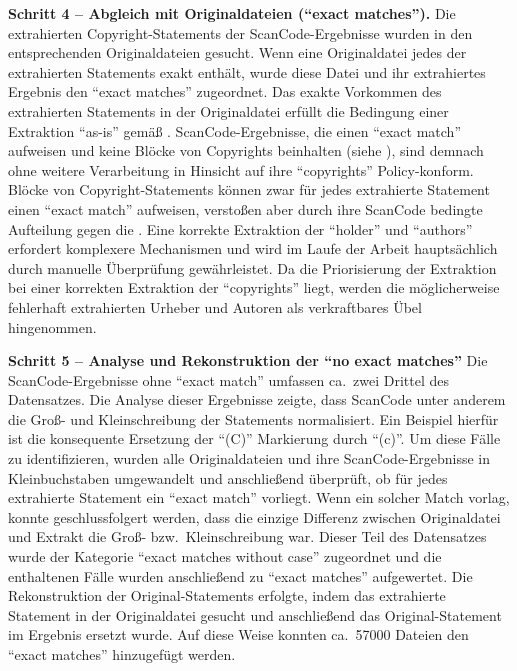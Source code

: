 \textbf{Schritt 4 -- Abgleich mit Originaldateien (\enquote{exact matches}).}
Die extrahierten Copyright-Statements der ScanCode-Ergebnisse wurden in den entsprechenden Originaldateien gesucht.
Wenn eine Originaldatei jedes der extrahierten Statements exakt enthält, wurde diese Datei und ihr extrahiertes Ergebnis den \enquote{exact matches} zugeordnet.
Das exakte Vorkommen des extrahierten Statements in der Originaldatei erfüllt die Bedingung einer Extraktion \enquote{as-is} gemäß .
ScanCode-Ergebnisse, die einen \enquote{exact match} aufweisen und keine Blöcke von Copyrights beinhalten (siehe ), sind demnach ohne weitere Verarbeitung in Hinsicht auf ihre \enquote{copyrights} Policy-konform.
Blöcke von Copyright-Statements können zwar für jedes extrahierte Statement einen \enquote{exact match} aufweisen, verstoßen aber durch ihre ScanCode bedingte Aufteilung gegen die .
Eine korrekte Extraktion der \enquote{holder} und \enquote{authors} erfordert komplexere Mechanismen und wird im Laufe der Arbeit hauptsächlich durch manuelle Überprüfung gewährleistet.
Da die Priorisierung der Extraktion bei einer korrekten Extraktion der \enquote{copyrights} liegt, werden die möglicherweise fehlerhaft extrahierten Urheber und Autoren als verkraftbares Übel hingenommen.

\textbf{Schritt 5 -- Analyse und Rekonstruktion der \enquote{no exact matches}}
Die ScanCode-Ergebnisse ohne \enquote{exact match} umfassen ca.\ zwei Drittel des Datensatzes.
Die Analyse dieser Ergebnisse zeigte, dass ScanCode unter anderem die Groß- und Kleinschreibung der Statements normalisiert.
Ein Beispiel hierfür ist die konsequente Ersetzung der \enquote{(C)} Markierung durch \enquote{(c)}.
Um diese Fälle zu identifizieren, wurden alle Originaldateien und ihre ScanCode-Ergebnisse in Kleinbuchstaben umgewandelt und anschließend überprüft, ob für jedes extrahierte Statement ein \enquote{exact match} vorliegt.
Wenn ein solcher Match vorlag, konnte geschlussfolgert werden, dass die einzige Differenz zwischen Originaldatei und Extrakt die Groß- bzw.\ Kleinschreibung war.
Dieser Teil des Datensatzes wurde der Kategorie \enquote{exact matches without case} zugeordnet und die enthaltenen Fälle wurden anschließend zu \enquote{exact matches} aufgewertet.
Die Rekonstruktion der Original-Statements erfolgte, indem das extrahierte Statement in der Originaldatei gesucht und anschließend das Original-Statement im Ergebnis ersetzt wurde.
Auf diese Weise konnten ca.\ \num{57000} Dateien den \enquote{exact matches} hinzugefügt werden.

